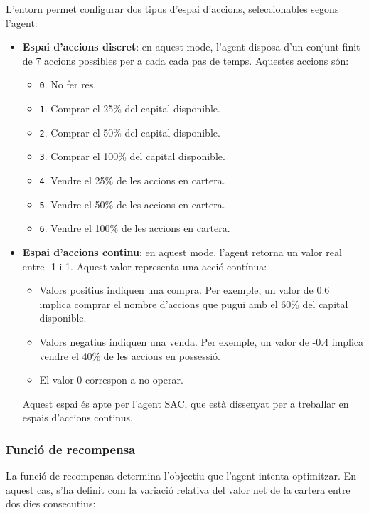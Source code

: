 \documentclass[12pt,a4paper,twoside]{book}
\begin{document}
L'entorn permet configurar dos tipus d'espai d'accions, seleccionables segons l'agent:
\begin{itemize}
    \item \textbf{Espai d'accions discret}: en aquest mode, l'agent disposa d'un conjunt finit de 7 accions possibles per a cada cada pas de temps. Aquestes accions són:
    \begin{itemize}
        \item \texttt{0}. No fer res.
        \item \texttt{1}. Comprar el 25\% del capital disponible.
        \item \texttt{2}. Comprar el 50\% del capital disponible.
        \item \texttt{3}. Comprar el 100\% del capital disponible.
        \item \texttt{4}. Vendre el 25\% de les accions en cartera.
        \item \texttt{5}. Vendre el 50\% de les accions en cartera.
        \item \texttt{6}. Vendre el 100\% de les accions en cartera.
    \end{itemize}

    \item \textbf{Espai d'accions continu}: en aquest mode, l'agent retorna un valor real entre -1 i 1. Aquest valor representa una acció contínua:
    \begin{itemize}
        \item Valors positius indiquen una compra. Per exemple, un valor de 0.6 implica comprar el nombre d'accions que pugui amb el 60\% del capital disponible.
        \item Valors negatius indiquen una venda. Per exemple, un valor de -0.4 implica vendre el 40\% de les accions en possessió.
        \item El valor 0 correspon a no operar.
    \end{itemize}
    Aquest espai és apte per l'agent SAC, que està dissenyat per a treballar en espais d'accions continus.
\end{itemize}

\subsubsection{Funció de recompensa}

La funció de recompensa determina l'objectiu que l'agent intenta optimitzar. En aquest cas, s'ha definit com la variació relativa del valor net de la cartera entre dos dies consecutius:
\end{document}
